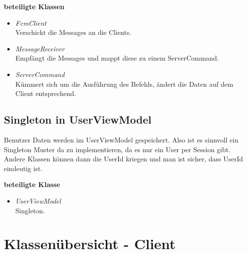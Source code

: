 \documentclass[11pt,a4paper]{article}
\begin{document}
\textbf{beteiligte Klassen}
\begin{itemize}
\item \textit{FcmClient} \\
Verschickt die Messages an die Clients.
\item \textit{MessageReceiver}\\
Empfängt die Messages und mappt diese zu einem ServerCommand.
\item \textit{ServerCommand}\\
Kümmert sich um die Ausführung des Befehls, ändert die Daten auf dem Client entsprechend.
\end{itemize}

\subsection{Singleton in UserViewModel}
Benutzer Daten werden im UserViewModel gespeichert. Also ist es sinnvoll ein Singleton Muster da zu implementieren, da es nur ein User per Session gibt. Andere Klassen können dann die UserId kriegen und man ist sicher, dass UserId eindeutig ist.

\textbf{beteiligte Klasse}
\begin{itemize}
\item \textit{UserViewModel} \\
Singleton.
\end{itemize}

\newpage

\section{Klassenübersicht - Client}
\end{document}
